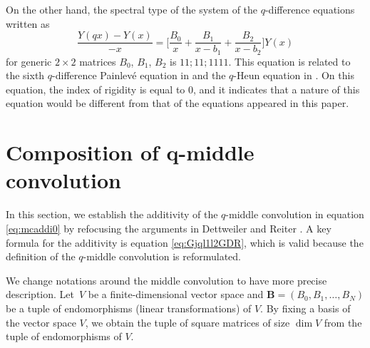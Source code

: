 \documentclass[pdftex]{sigma}
\numberwithin{equation}{section}
\theoremstyle{definition}
\begin{document}
On the other hand, the spectral type of the system of the $q$-difference equations written as
\begin{equation*}
\frac{Y(q x) - Y(x )}{-x} = \Biggl[ \frac{B_{0}}{x} + \frac{B_{1}}{x -b_{1}} + \frac{B_{2}}{x -b_{2}} \Biggr] Y(x) %
\end{equation*}
for generic $2\times 2$ matrices $B_0$, $B_1$, $B_2 $ is $11;11;1111$.
This equation is related to the sixth $q$-difference Painlev\'e equation in \cite{JS} and the $q$-Heun equation in \cite{STT,TakR,TakqH}.
On this equation, the index of rigidity is equal to $0$, and it indicates that a nature of this equation would be different from that of the equations appeared in this paper.

\section[Composition of q-middle convolution]{Composition of $\boldsymbol{q}$-middle convolution} \label{sec:compqmc}

In this section, we establish the additivity of the $q$-middle convolution in equation \eqref{eq:mcaddi0} by refocusing the arguments in Dettweiler and Reiter \cite{DR1, DR2}.
A key formula for the additivity is equation \eqref{eq:Gjql1l2GDR}, which is valid because the definition of the $q$-middle convolution is reformulated.

We change notations around the middle convolution to have more precise description.
Let~$V$ be a finite-dimensional vector space and $\boldsymbol{B} = ( B_0, B_1, \dots , B_N)$ be a tuple of endomorphisms (linear transformations) of $V$.
By fixing a basis of the vector space $V$, we obtain the tuple of square matrices of size $\dim V$ from the tuple of endomorphisms of $V$.
\end{document}
